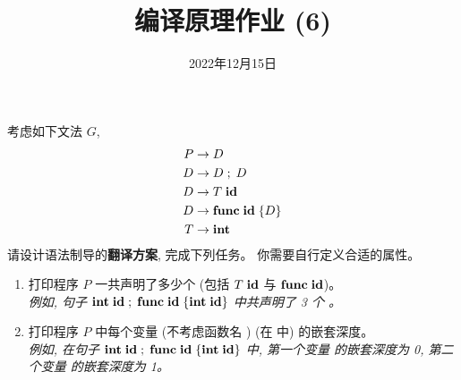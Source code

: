 \documentclass[a4paper, justified]{tufte-handout}
\title{编译原理作业 (6)}
\date{2022年12月15日}
\begin{document}
\maketitle
\noplagiarism %
\begin{abstract}
\end{abstract}
\beginrequired

\begin{problem}
  考虑如下文法 $G$,
  \begin{align*}
    P &\to D \\
    D &\to D \;;\; D \\
    D &\to T\; \text{\bf id} \\
    D &\to \text{\bf func}\; \text{\bf id}\; \{D\} \\
    T &\to \text{\bf int}
  \end{align*}
  请设计语法制导的{\bf 翻译方案}, 完成下列任务。
  你需要自行定义合适的属性。
  \begin{enumerate}[(1)]
    \item 打印程序 $P$ 一共声明了多少个 \idkw\; (包括 $T\; \text{\bf id}$ 与 $\text{\bf func}\; \text{\bf id}$)。\\
      {\it 例如, 句子 $\text{\bf int}\; \text{\bf id} \;;\; \text{\bf func}\; \text{\bf id}\; \{\text{\bf int}\; \text{\bf id}\}$ 中共声明了 3 个 \idkw。}
    \item 打印程序 $P$ 中每个变量 \idkw{} (不考虑函数名 \idkw) (在 \set{} 中) 的嵌套深度。\\
      {\it 例如, 在句子 $\text{\bf int}\; \text{\bf id} \;;\; \text{\bf func}\; \text{\bf id}\; \{\text{\bf int}\; \text{\bf id}\}$ 中,
        第一个变量 \idkw{} 的嵌套深度为 0, 第二个变量 \idkw{} 的嵌套深度为 1。}
  \end{enumerate}
\end{problem}
\end{document}
